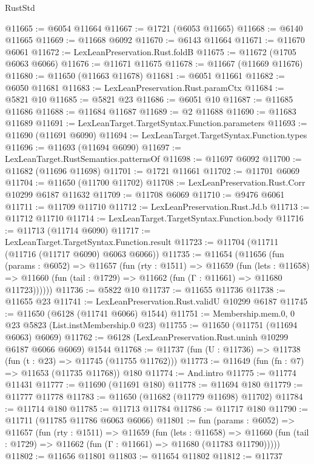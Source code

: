\begin{lexlean}{RustStd}
\begin{coremodule}
@11665 := @6054 @11664
@11667 := @1721 (@6053 @11665)
@11668 := @6140 @11665
@11669 := @11668 @6092
@11670 := @6143 @11664
@11671 := @11670 @6061
@11672 := LexLeanPreservation.Rust.foldB
@11675 := @11672 (@1705 @6063 @6066)
@11676 := @11671 @11675
@11678 := @11667 (@11669 @11676)
@11680 := @11650 (@11663 @11678)
@11681 := @6051 @11661
@11682 := @6050 @11681
@11683 := LexLeanPreservation.Rust.paramCtx
@11684 := @5821 @10
@11685 := @5821 @23
@11686 := @6051 @10
@11687 := @11685 @11686
@11688 := @11684 @11687
@11689 := @2 @11688
@11690 := @11683 @11689
@11691 := LexLeanTarget.TargetSyntax.Function.parameters
@11693 := @11690 (@11691 @6090)
@11694 := LexLeanTarget.TargetSyntax.Function.types
@11696 := @11693 (@11694 @6090)
@11697 := LexLeanTarget.RustSemantics.patternsOf
@11698 := @11697 @6092
@11700 := @11682 (@11696 @11698)
@11701 := @1721 @11661
@11702 := @11701 @6069
@11704 := @11650 (@11700 @11702)
@11708 := LexLeanPreservation.Rust.Corr @10299 @6187 @11632
@11709 := @11708 @6069
@11710 := @9476 @6061
@11711 := @11709 @11710
@11712 := LexLeanPreservation.Rust.Jd.b
@11713 := @11712 @11710
@11714 := LexLeanTarget.TargetSyntax.Function.body
@11716 := @11713 (@11714 @6090)
@11717 := LexLeanTarget.TargetSyntax.Function.result
@11723 := @11704 (@11711 (@11716 (@11717 @6090) @6063 @6066))
@11735 := @11654
    (@11656
      (fun (params : @6052) =>
      @11657
        (fun (rty : @1511) =>
        @11659
          (fun (lets : @11658) =>
          @11660 (fun (tail : @1729) => @11662 (fun (Γ : @11661) => @11680 @11723))))))
@11736 := @5822 @10
@11737 := @11655 @11736
@11738 := @11655 @23
@11741 := LexLeanPreservation.Rust.validU @10299 @6187
@11745 := @11650 (@6128 (@11741 @6066) @1544)
@11751 := Membership.mem.{0, 0} @23 @5823 (List.instMembership.{0} @23)
@11755 := @11650 (@11751 (@11694 @6063) @6069)
@11762 := @6128 (LexLeanPreservation.Rust.uninh @10299 @6187 @6066 @6069) @1544
@11768 := @11737 (fun (U : @11736) => @11738 (fun (t : @23) => @11745 (@11755 @11762)))
@11773 := @11649 (fun (fn : @7) => @11653 (@11735 @11768)) @180
@11774 := And.intro
@11775 := @11774 @11431
@11777 := @11690 (@11691 @180)
@11778 := @11694 @180
@11779 := @11777 @11778
@11783 := @11650 (@11682 (@11779 @11698) @11702)
@11784 := @11714 @180
@11785 := @11713 @11784
@11786 := @11717 @180
@11790 := @11711 (@11785 @11786 @6063 @6066)
@11801 := fun (params : @6052) =>
  @11657
    (fun (rty : @1511) =>
    @11659
      (fun (lets : @11658) =>
      @11660 (fun (tail : @1729) => @11662 (fun (Γ : @11661) => @11680 (@11783 @11790)))))
@11802 := @11656 @11801
@11803 := @11654 @11802
@11812 := @11737

\end{coremodule}
\end{lexlean}
